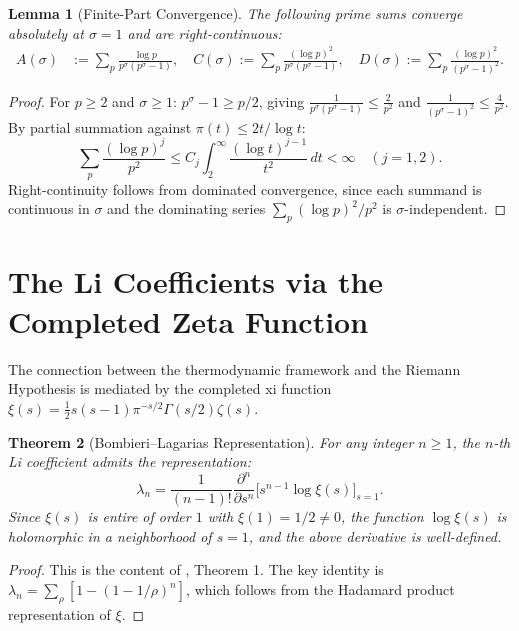 \documentclass[12pt,a4paper]{article}
\newtheorem{theorem}{Theorem}[section]
\newtheorem{lemma}[theorem]{Lemma}
\theoremstyle{definition}
\theoremstyle{remark}
\begin{document}
\begin{lemma}[Finite-Part Convergence]\label{lem:finite-part}
The following prime sums converge absolutely at $\sigma = 1$ and are right-continuous:
\begin{align*}
A(\sigma) &:= \sum_p \frac{\log p}{p^\sigma(p^\sigma - 1)}, \quad
C(\sigma) := \sum_p \frac{(\log p)^2}{p^\sigma(p^\sigma - 1)}, \quad
D(\sigma) := \sum_p \frac{(\log p)^2}{(p^\sigma - 1)^2}.
\end{align*}
\end{lemma}
\begin{proof}
For $p \ge 2$ and $\sigma \ge 1$: $p^\sigma - 1 \ge p/2$, giving $\frac{1}{p^\sigma(p^\sigma-1)} \le \frac{2}{p^2}$ and $\frac{1}{(p^\sigma-1)^2} \le \frac{4}{p^2}$. By partial summation against $\pi(t) \le 2t/\log t$:
\[ \sum_p \frac{(\log p)^j}{p^2} \le C_j \int_2^\infty \frac{(\log t)^{j-1}}{t^2}\,dt < \infty \quad (j=1,2). \]
Right-continuity follows from dominated convergence, since each summand is continuous in $\sigma$ and the dominating series $\sum_p (\log p)^2/p^2$ is $\sigma$-independent.
\end{proof}

\section{The Li Coefficients via the Completed Zeta Function}

The connection between the thermodynamic framework and the Riemann Hypothesis is mediated by the completed xi function $\xi(s) = \tfrac{1}{2}s(s-1)\pi^{-s/2}\Gamma(s/2)\zeta(s)$.

\begin{theorem}[Bombieri--Lagarias Representation] \label{thm:B21}
For any integer $n \ge 1$, the $n$-th Li coefficient admits the representation:
\[ \lambda_n = \frac{1}{(n-1)!} \frac{\partial^n}{\partial s^n} \Big[ s^{n-1} \log \xi(s) \Big]_{s=1}. \]
Since $\xi(s)$ is entire of order $1$ with $\xi(1) = 1/2 \ne 0$, the function $\log\xi(s)$ is holomorphic in a neighborhood of $s=1$, and the above derivative is well-defined.
\end{theorem}

\begin{proof}
This is the content of \cite{BombieriLagarias1999}, Theorem 1. The key identity is $\lambda_n = \sum_\rho [1 - (1-1/\rho)^n]$, which follows from the Hadamard product representation of $\xi$.
\end{proof}
\end{document}
